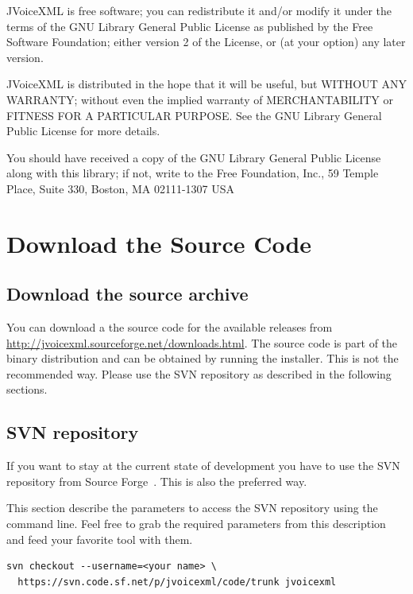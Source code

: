 \documentclass[11pt,a4paper]{article}
\begin{document}
JVoiceXML is free software; you can redistribute it and/or
modify it under the terms of the GNU Library General Public
License as published by the Free Software Foundation; either
version 2 of the License, or (at your option) any later version.

JVoiceXML is distributed in the hope that it will be useful,
but WITHOUT ANY WARRANTY; without even the implied warranty of
MERCHANTABILITY or FITNESS FOR A PARTICULAR PURPOSE. See the GNU
Library General Public License for more details.

You should have received a copy of the GNU Library General Public
License along with this library; if not, write to the Free
Foundation, Inc., 59 Temple Place, Suite 330, Boston, MA  02111-1307  USA

\section{Download the Source Code}

\subsection{Download the source archive}

You can download a the source code for the available releases from 
\url{http://jvoicexml.sourceforge.net/downloads.html}. The source code is part of
the binary distribution and can be obtained by running the installer. This is
not the recommended way. Please use the SVN repository as described in
the following sections. \\

\subsection{SVN repository}
\label{sec:svn-repository}

If you want to stay at the current state of development you have to use
the SVN repository from Source Forge~\cite{sourceforge}.
This is also the preferred way.

This section describe the parameters to access the SVN repository 
using the command line. Feel free to grab the required parameters from
this description and feed your favorite tool with them.

\begin{lstlisting}
svn checkout --username=<your name> \
  https://svn.code.sf.net/p/jvoicexml/code/trunk jvoicexml
\end{lstlisting}
\end{document}
